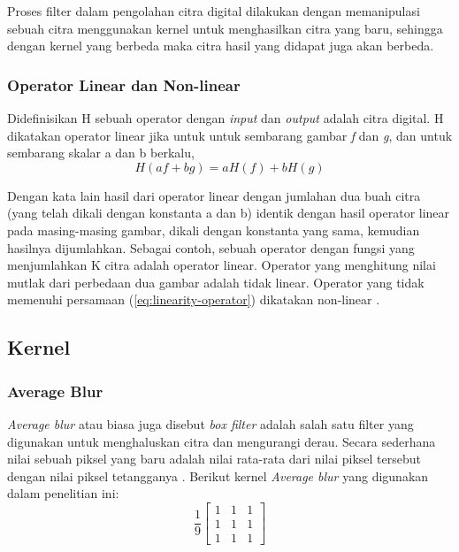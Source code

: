 Proses filter dalam pengolahan citra digital dilakukan dengan memanipulasi sebuah citra menggunakan kernel untuk menghasilkan citra yang baru, sehingga dengan kernel yang berbeda maka citra hasil yang didapat juga akan berbeda. 


\subsubsection{Operator Linear dan Non-linear}
Didefinisikan H sebuah operator dengan \textit{input} dan \textit{output} adalah citra digital. H dikatakan operator linear jika untuk untuk sembarang gambar \textit{f} dan \textit{g}, dan untuk sembarang skalar a dan b berkalu,
\begin{equation}
    \label{eq:linearity-operator}
    H(af + bg) = aH(f) + bH(g)
\end{equation}

Dengan kata lain hasil dari operator linear dengan jumlahan dua buah citra (yang telah dikali dengan konstanta a dan b) identik dengan hasil operator linear pada masing-masing gambar, dikali dengan konstanta yang sama, kemudian hasilnya dijumlahkan. Sebagai contoh, sebuah operator dengan fungsi yang menjumlahkan K citra adalah operator linear. Operator yang menghitung nilai mutlak dari perbedaan dua gambar adalah tidak linear. Operator yang tidak memenuhi persamaan (\ref{eq:linearity-operator}) dikatakan non-linear .


\subsection{Kernel}

\subsubsection{Average Blur}
\textit{Average blur} atau biasa juga disebut \textit{box filter} adalah salah satu filter yang digunakan untuk menghaluskan citra dan mengurangi derau. Secara sederhana nilai sebuah piksel yang baru adalah nilai rata-rata dari nilai piksel tersebut dengan nilai piksel tetangganya . Berikut kernel \textit{Average blur} yang digunakan dalam penelitian ini:
\begin{equation}
    \label{kernel:average}
    \frac{1}{9} \left[
    \begin{matrix}
 1 & 1 & 1 \\
 1 & 1 & 1 \\
 1 & 1 & 1
    \end{matrix}
    \right]
\end{equation}

